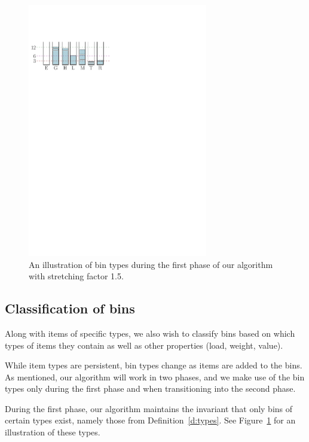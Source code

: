\begin{figure}[th]
\begin{center}
\includegraphics[width=0.7\textwidth]{img/bin_types.pdf}
\end{center}
\caption{An illustration of bin types during the first phase of our algorithm with stretching factor 1.5.}
\label{fig:1a}
\end{figure}
%


\subsection{Classification of bins}

Along with items of specific types, we also wish to classify bins
based on which types of items they contain as well as other properties
(load, weight, value).

While item types are persistent, bin types change as items are added
to the bins. As mentioned, our algorithm will work in two phases, and
we make use of the bin types only during the first phase and when
transitioning into the second phase.

During the first phase, our algorithm maintains the invariant that
only bins of certain types exist, namely those from
Definition~\ref{d:types}. See Figure~\ref{fig:1a} for an illustration
of these types.

